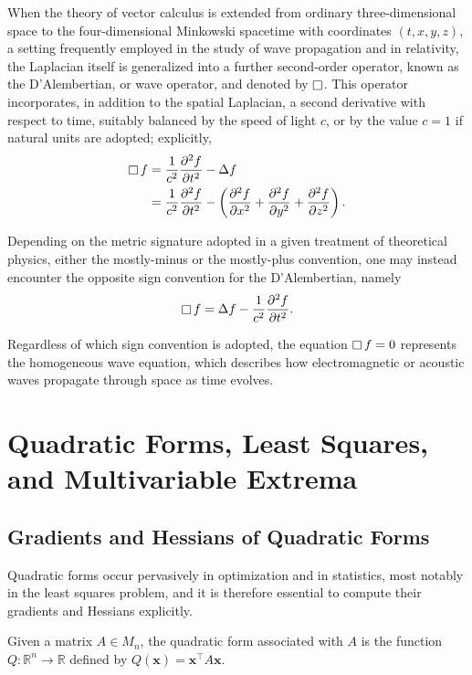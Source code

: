 When the theory of vector calculus is extended from ordinary three-dimensional space to the four-dimensional Minkowski spacetime with coordinates $(t,x,y,z)$, a setting frequently employed in the study of wave propagation and in relativity, the Laplacian itself is generalized into a further second-order operator, known as the D'Alembertian, or wave operator, and denoted by $\mathop{\Box}\nolimits$. This operator incorporates, in addition to the spatial Laplacian, a second derivative with respect to time, suitably balanced by the speed of light $c$, or by the value $c=1$ if natural units are adopted; explicitly,
\[
\begin{aligned}
\mathop{\Box}\nolimits f &= \frac{1}{c^2} \frac{\partial^2 f}{\partial t^2} - \Delta f \\
&= \frac{1}{c^2} \frac{\partial^2 f}{\partial t^2}
- \left( \frac{\partial^2 f}{\partial x^2} + \frac{\partial^2 f}{\partial y^2} + \frac{\partial^2 f}{\partial z^2} \right).
\end{aligned}
\]

\begin{remark}
Depending on the metric signature adopted in a given treatment of theoretical physics, either the mostly-minus or the mostly-plus convention, one may instead encounter the opposite sign convention for the D'Alembertian, namely
\[
\mathop{\Box}\nolimits f = \Delta f - \frac{1}{c^2} \frac{\partial^2 f}{\partial t^2}.
\]

Regardless of which sign convention is adopted, the equation $\mathop{\Box}\nolimits f = 0$ represents the homogeneous wave equation, which describes how electromagnetic or acoustic waves propagate through space as time evolves.
\end{remark}

\section{Quadratic Forms, Least Squares, and Multivariable Extrema}

\subsection{Gradients and Hessians of Quadratic Forms}

Quadratic forms occur pervasively in optimization and in statistics, most notably in the least squares problem, and it is therefore essential to compute their gradients and Hessians explicitly.

\begin{definition}
Given a matrix $A \in M_n$, the quadratic form associated with $A$ is the function $Q : \mathbb{R}^n \to \mathbb{R}$ defined by $Q(\mathbf{x}) = \mathbf{x}^{\top} A \mathbf{x}$.

\end{definition}

